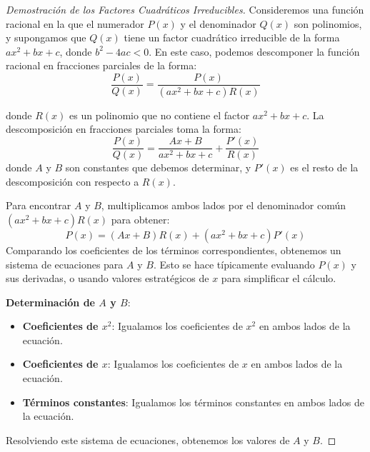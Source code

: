 \begin{proof}[Demostración de los Factores Cuadráticos Irreducibles]
    Consideremos una función racional en la que el numerador \( P(x) \) y el denominador \( Q(x) \) son polinomios, y supongamos que \( Q(x) \) tiene un factor cuadrático irreducible de la forma \( ax^2 + bx + c \), donde \( b^2 - 4ac < 0 \). En este caso, podemos descomponer la función racional en fracciones parciales de la forma:
\[
\frac{P(x)}{Q(x)} = \frac{P(x)}{(ax^2 + bx + c)R(x)}
\]

donde \( R(x) \) es un polinomio que no contiene el factor \( ax^2 + bx + c \). La descomposición en fracciones parciales toma la forma:
\[
\frac{P(x)}{Q(x)} = \frac{Ax + B}{ax^2 + bx + c} + \frac{P'(x)}{R(x)}
\]
donde \( A \) y \( B \) son constantes que debemos determinar, y \( P'(x) \) es el resto de la descomposición con respecto a \( R(x) \).

Para encontrar \( A \) y \( B \), multiplicamos ambos lados por el denominador común \( (ax^2 + bx + c)R(x) \) para obtener:
\[
P(x) = (Ax + B)R(x) + (ax^2 + bx + c)P'(x)
\]
Comparando los coeficientes de los términos correspondientes, obtenemos un sistema de ecuaciones para \( A \) y \( B \). Esto se hace típicamente evaluando \( P(x) \) y sus derivadas, o usando valores estratégicos de \( x \) para simplificar el cálculo.

\textbf{Determinación de \( A \) y \( B \)}:

\begin{itemize}
    \item \textbf{Coeficientes de \( x^2 \)}: Igualamos los coeficientes de \( x^2 \) en ambos lados de la ecuación.
    \item \textbf{Coeficientes de \( x \)}: Igualamos los coeficientes de \( x \) en ambos lados de la ecuación.
    \item \textbf{Términos constantes}: Igualamos los términos constantes en ambos lados de la ecuación.
    
\end{itemize}
Resolviendo este sistema de ecuaciones, obtenemos los valores de \( A \) y \( B \).
\end{proof}
